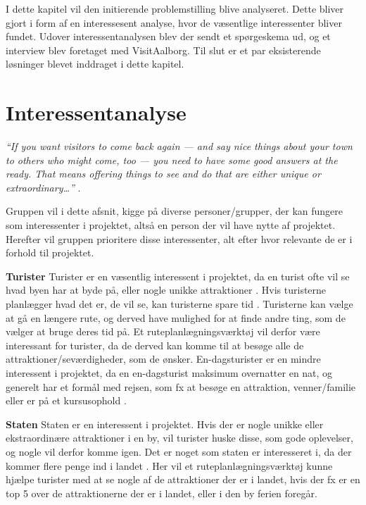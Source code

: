 I dette kapitel vil den initierende problemstilling blive analyseret. Dette bliver gjort i form af en interessesent analyse, hvor de væsentlige interessenter bliver fundet. Udover interessentanalysen blev der sendt et spørgeskema ud, og et interview blev foretaget med VisitAalborg. Til slut er et par eksisterende løsninger blevet inddraget i dette kapitel. 

\section{Interessentanalyse}

\textit{“If you want visitors to come back again — and say nice things about your town to others who might come, too — you need to have some good answers at the ready. That means offering things to see and do that are either unique or extraordinary…”} \citep{UniversityOfMinnesota}.

Gruppen vil i dette afsnit, kigge på diverse personer/grupper, der kan fungere som interessenter i projektet, altså en person der vil have nytte af projektet. Herefter vil gruppen prioritere disse interessenter, alt efter hvor relevante de er i forhold til projektet.

\textbf{Turister}\newline
Turister er en væsentlig interessent i projektet, da en turist ofte vil se hvad byen har at byde på, eller nogle unikke attraktioner \citep{UniversityOfMinnesota}. 
Hvis turisterne planlægger hvad det er, de vil se, kan turisterne spare tid \citep{YouthCentral}. Turisterne kan vælge at gå en længere rute, og derved have mulighed for at finde andre ting, som de vælger at bruge deres tid på. Et ruteplanlægningsværktøj vil derfor være interessant for turister, da de derved kan komme til at besøge alle de attraktioner/seværdigheder, som de ønsker.
En-dagsturister er en mindre interessent i projektet, da en en-dagsturist maksimum overnatter en nat, og generelt har et formål med rejsen, som fx at besøge en attraktion, venner/familie eller er på et kursusophold \citep{Faxe}.

\textbf{Staten}\newline
Staten er en interessent i projektet. Hvis der er nogle unikke eller ekstraordinære attraktioner i en by, vil turister huske disse, som gode oplevelser, og nogle vil derfor komme igen. Det er noget som staten er interesseret i, da der kommer flere penge ind i landet \citep{VisitAalborg}.
Her vil et ruteplanlægningsværktøj kunne hjælpe turister med at se nogle af de attraktioner der er i landet, hvis der fx er en top 5 over de attraktionerne der er i landet, eller i den by ferien foregår.

